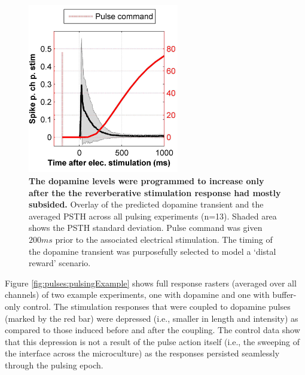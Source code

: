  \begin{figure}[h]

      \centering
      \includegraphics[width=6.6cm]{chapter6/figures/pulseTiming/dopaminePulsingPulseTiming.jpg}
      \caption[Timing of dopamine transient relative to reverberative stimulation response]{\textbf{The dopamine levels were programmed to increase only after the the reverberative stimulation response had mostly subsided.} Overlay of the predicted dopamine transient and the averaged PSTH across all pulsing experiments (n=13). Shaded area shows the PSTH standard deviation. Pulse command was given \(200 ms\) prior to the associated electrical stimulation. The timing of the dopamine transient was purposefully selected to model a `distal reward' scenario.}
      \label{fig:pulses:pulseTiming}

\end{figure}




   Figure \ref{fig:pulses:pulsingExample} shows full response rasters (averaged over all channels) of two example experiments, one with dopamine and one with buffer-only control. The stimulation responses that were coupled to dopamine pulses (marked by the red bar) were depressed (i.e., smaller in length and intensity) as compared to those induced before and after the coupling. The control data show that this depression is not a result of the pulse action itself (i.e., the sweeping of the interface across the microculture) as the responses persisted seamlessly through the pulsing epoch.

